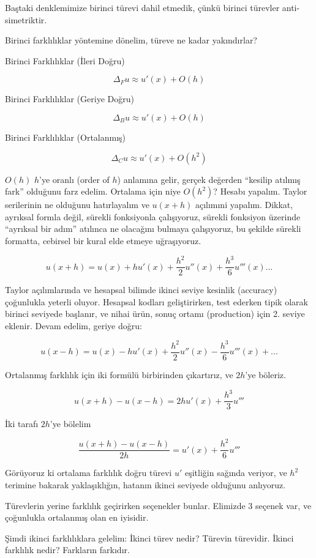 \documentclass[12pt,fleqn]{article}\usepackage{../../common}
\begin{document}
Baştaki denklemimize birinci türevi dahil etmedik, çünkü birinci türevler
anti-simetriktir. 

Birinci farklılıklar yöntemine dönelim, türeve ne kadar yakındırlar? 

Birinci Farklılıklar (İleri Doğru)

$$ \Delta_Fu  \approx u'(x) + O(h) $$

Birinci Farklılıklar (Geriye Doğru)

$$ \Delta_Bu \approx u'(x) + O(h)$$

Birinci Farklılıklar (Ortalanmış)

$$ \Delta_Cu  \approx u'(x) + O(h^2)$$

$O(h)$ $h$'ye oranlı (order of $h$) anlamına gelir, gerçek değerden
``kesilip atılmış fark'' olduğunu farz edelim. Ortalama için niye $O(h^2)$?
Hesabı yapalım. Taylor serilerinin ne olduğunu hatırlayalım ve $u(x+h)$
açılımıni yapalım. Dikkat, ayrıksal formla değil, sürekli fonksiyonla
çalışıyoruz, sürekli fonksiyon üzerinde ``ayrıksal bir adım'' atılınca ne
olacağını bulmaya çalışıyoruz, bu şekilde sürekli formatta, cebirsel bir
kural elde etmeye uğraşıyoruz.

$$ u(x+h) = u(x)+hu'(x)+\frac{h^2}{2}u''(x) + \frac{h^3}{6}u'''(x) ...$$

Taylor açılımlarında ve hesapsal bilimde ikinci seviye kesinlik (accuracy)
çoğunlukla yeterli oluyor. Hesapsal kodları geliştirirken, test ederken
tipik olarak birinci seviyede başlanır, ve nihai ürün, sonuç ortamı
(production) için 2. seviye eklenir. Devam edelim, geriye doğru:

$$ u(x-h) = u(x)-hu'(x)+\frac{h^2}{2}u''(x) - \frac{h^3}{6}u'''(x) + ...$$

Ortalanmış farklılık için iki formülü birbirinden çıkartırız, ve $2h$'ye
böleriz.

$$ u(x+h)-u(x-h) = 2hu'(x) + \frac{h^3}{3}u'''$$

İki tarafı $2h$'ye bölelim

$$ \frac{u(x+h)-u(x-h)}{2h} = u'(x) + \frac{h^2}{6}u'''$$

Görüyoruz ki ortalama farklılık doğru türevi $u'$ eşitliğin sağında
veriyor, ve $h^2$ terimine bakarak yaklaşıklığın, hatanın ikinci seviyede
olduğunu anlıyoruz. 

Türevlerin yerine farklılık geçirirken seçenekler bunlar. Elimizde 3
seçenek var, ve çoğunlukla ortalanmış olan en iyisidir.

Şimdi ikinci farklılıklara gelelim: İkinci türev nedir? Türevin
türevidir. İkinci farklılık nedir? Farkların farkıdır.
\end{document}
